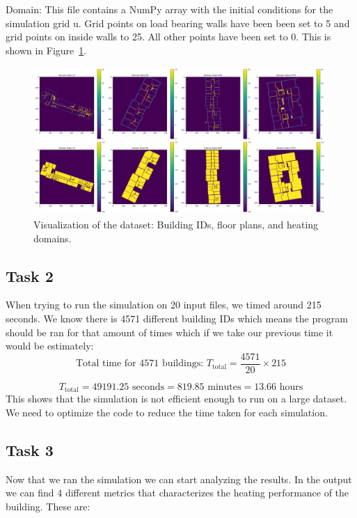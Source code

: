 \documentclass[a4paper,12pt]{article}
\begin{document}
Domain: This file contains a NumPy array with the initial conditions for the
simulation grid u. Grid points on load bearing walls have been been set to 5 and grid points on
inside walls to 25. All other points have been set to 0.
This is shown in Figure~\ref{fig:combined_plot}.

\begin{figure}[h!]
        \centering
        \includegraphics[width=1\textwidth]{GeneralPlots/combined_plot.png}
        \caption{Visualization of the dataset: Building IDs, floor plans, and heating domains.}
        \label{fig:combined_plot}
\end{figure}

\subsection{Task 2}
When trying to run the simulation on 20 input files, we timed around 215 seconds. We know there is 4571 different building IDs which means the program should be ran for that amount of times which if we take our previous time it would be estimately:
\[
\text{Total time for 4571 buildings: } T_{\text{total}} = \frac{4571}{20} \times 215
\]

\[
T_{\text{total}} = 49191.25 \text{ seconds} = 819.85 \text{ minutes} = 13.66 \text{ hours}
\]
This shows that the simulation is not efficient enough to run on a large dataset. We need to optimize the code to reduce the time taken for each simulation.


\subsection{Task 3}
Now that we ran the simulation we can start analyzing the results. In the output we can find 4 different metrics that characterizes the heating performance of the building. These are:
\end{document}
